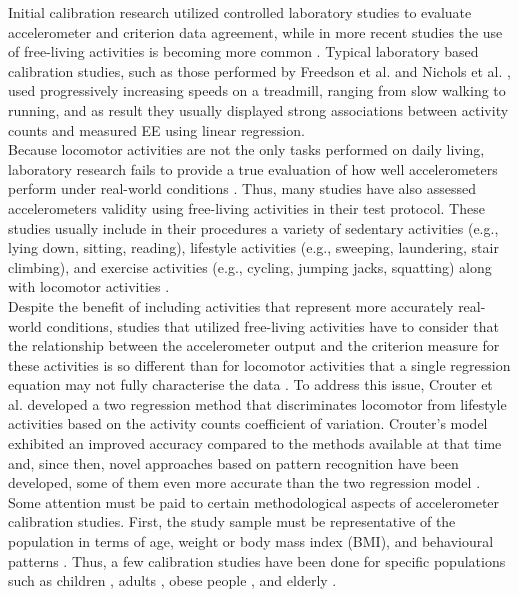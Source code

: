 \documentclass[11pt]{article}
\begin{document}
Initial calibration research utilized controlled laboratory studies to evaluate accelerometer and criterion data agreement, while in more recent studies the use of free-living activities is becoming more common \cite{Welk_2005, Matthews_2005}. Typical laboratory based calibration studies, such as those performed by Freedson et al. \citeyear{Freedson_1998} and Nichols et al. \citeyear{Nichols_1999}, used progressively increasing speeds on a treadmill, ranging from slow walking to running, and as result they usually displayed strong associations between activity counts and measured EE using linear regression. \\

Because locomotor activities are not the only tasks performed on daily living, laboratory research fails to provide a true evaluation of how well accelerometers perform under real-world conditions \cite{Welk_2005}. Thus, many studies have also assessed accelerometers validity using free-living activities in their test protocol. These studies usually include in their procedures a variety of sedentary activities (e.g., lying down, sitting, reading), lifestyle activities (e.g., sweeping, laundering, stair climbing), and exercise activities (e.g., cycling, jumping jacks, squatting) along with locomotor activities \cite{Montoye_2015, Montoye_2016b}. \\

Despite the benefit of including activities that represent more accurately real-world conditions, studies that utilized free-living activities have to consider that the relationship between the accelerometer output and the criterion measure for these activities is so different than for locomotor activities that a single regression equation may not fully characterise the data \cite{Welk_2005}. To address this issue, Crouter et al. \citeyear{Crouter_2006} developed a two regression method that discriminates locomotor from lifestyle activities based on the activity counts coefficient of variation. Crouter's model exhibited an improved accuracy compared to the methods available at that time and, since then, novel approaches based on pattern recognition have been developed, some of them even more accurate than the two regression model \cite{Farrahi_2019, Basset_2012}. \\

Some attention must be paid to certain methodological aspects of accelerometer calibration studies. First, the study sample must be representative of the population in terms of age, weight or body mass index (BMI), and behavioural patterns \cite{Welk_2005}. Thus, a few calibration studies have been done for specific populations such as children \cite{Phillips_2013, McMurray_2016}, adults \cite{Freedson_1998, Hibbing_2018}, obese people \cite{Aadland_2012}, and elderly \cite{Evenson_2015}. \\
\end{document}

